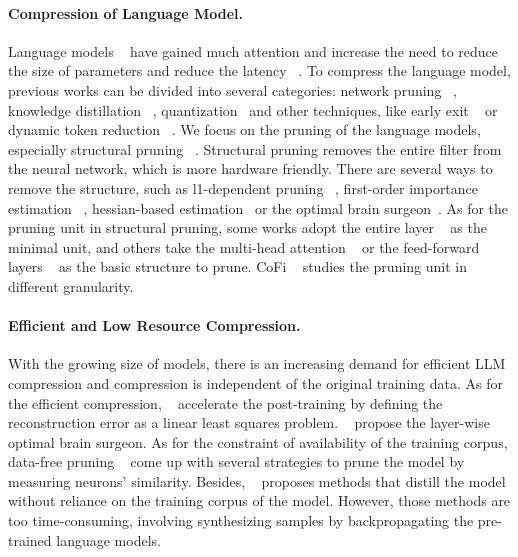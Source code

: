 \paragraph{Compression of Language Model.}
Language models ~\cite{devlin2018bert,liu2019roberta,lewis2019bart} have gained much attention and increase the need to reduce the size of parameters and reduce the latency ~\cite{lanalbert,sun2020mobilebert}. To compress the language model, previous works can be divided into several categories: network pruning ~\cite{kurtic2022optimal,xu2021rethinking,liu2021ebert,ProximalPruning}, knowledge distillation ~\cite{sun2019patient,sun-etal-2020-contrastive,metakd}, quantization~\cite{yao2022zeroquant,bai2020binarybert,zafrir2019q8bert} and other techniques, like early exit ~\cite{xin-etal-2020-deebert} or dynamic token reduction ~\cite{ye-etal-2021-tr}. We focus on the pruning  of the language models, especially structural pruning ~\cite{li2016pruning}. Structural pruning removes the entire filter from the neural network, which is more hardware friendly. There are several ways to remove the structure, such as l1-dependent pruning ~\cite{NIPS2015_pruning,zafrir2021prune}, first-order importance estimation ~\cite{hou2020dynabert}, hessian-based estimation~\cite{kurtic2022optimal,wang2019eigendamage} or the optimal brain surgeon~\cite{lecun1989optimal,kurtic2022optimal}. As for the pruning unit in structural pruning, some works adopt the entire layer ~\cite{fan2019reducing} as the minimal unit, and others take the multi-head attention ~\cite{voita2019analyzing} or the feed-forward layers ~\cite{hou2020dynabert,mccarley2019structured} as the basic structure to prune. CoFi ~\cite{xia2022structured} studies the pruning unit in different granularity. 

\paragraph{Efficient and Low Resource Compression.} With the growing size of models, there is an increasing demand for efficient LLM compression and compression is independent of the original training data. As for the efficient compression, ~\cite{kwon2022fast} accelerate the post-training by defining the reconstruction error as a linear least squares problem. ~\cite{frantar2022gptq,frantar2023massive} propose the layer-wise optimal brain surgeon. As for the constraint of availability of the training corpus, data-free pruning ~\cite{srinivas2015data,yvinec2022red++} come up with several strategies to prune the model by measuring neurons' similarity. Besides, ~\cite{maprompting,ma2020adversarial,rashid2020zeroshot} proposes methods that distill the model without reliance on the training corpus of the model. However, those methods are too time-consuming, involving synthesizing samples by backpropagating the pre-trained language models.

